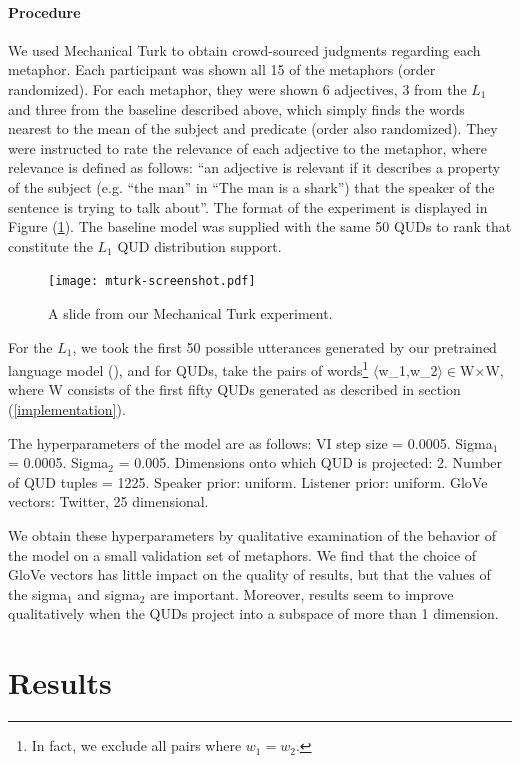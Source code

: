 \documentclass[10pt,letterpaper,twocolumn]{article}
\begin{document}
\paragraph{Procedure} We used Mechanical Turk to obtain crowd-sourced judgments regarding each metaphor. Each participant was shown all 15 of the metaphors (order randomized). For each metaphor, they were shown 6 adjectives, 3 from the $L_1$ and three from the baseline described above, which simply finds the words nearest to the mean of the subject and predicate (order also randomized). They were instructed to rate the relevance of each adjective to the metaphor, where relevance is defined as follows: ``an adjective is relevant if it describes a property of the subject (e.g. ``the man'' in ``The man is a shark'') that the speaker of the sentence is trying to talk about''. The format of the experiment is displayed in Figure (\ref{fig:1}). The baseline model was supplied with the same 50 QUDs to rank that constitute the $L_1$ QUD distribution support.

\begin{figure} \label{screenshot}
\centerline{\texttt{[image: mturk-screenshot.pdf]}}
\caption{A slide from our Mechanical Turk experiment.} \label{fig:1}
\end{figure}

For the $L_1$, we took the first 50 possible utterances generated by our pretrained language model (\cite{jozefowicz2016exploring}), and for QUDs, take the pairs of words\footnote{In fact, we exclude all pairs where $w_1=w_2$.} $\langle$w_1,w_2$\rangle\in$W$\times$W, where W consists of the first fifty QUDs generated as described in section (\ref{implementation}). 

The hyperparameters of the model are as follows: VI step size = 0.0005. Sigma$_1$ = 0.0005. Sigma$_2$ = 0.005. Dimensions onto which QUD is projected: 2. Number of QUD tuples = 1225. Speaker prior: uniform. Listener prior: uniform. GloVe vectors: Twitter, 25 dimensional.

We obtain these hyperparameters by qualitative examination of the behavior of the model on a small validation set of metaphors. We find that the choice of GloVe vectors has little impact on the quality of results, but that the values of the sigma$_1$ and sigma$_2$ are important. Moreover, results seem to improve qualitatively when the QUDs project into a subspace of more than 1 dimension. 

\section{Results}
\end{document}
